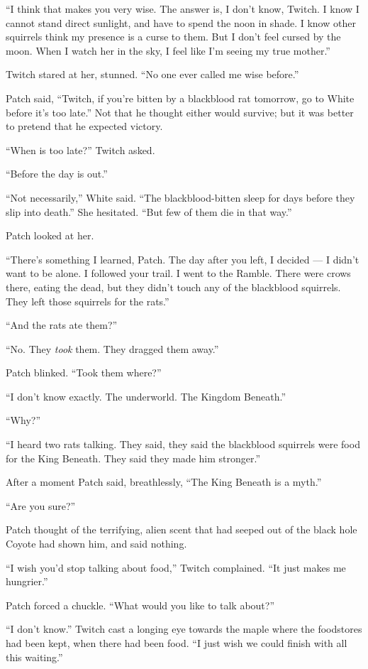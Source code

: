 \documentclass[ebook,oneside,openany,17pt]{memoir}
\begin{document}
“I think that makes you very wise. The answer is, I don’t know,
Twitch. I know I cannot stand direct sunlight, and have to spend the
noon in shade. I know other squirrels think my presence is a curse to
them. But I don’t feel cursed by the moon. When I watch her in the
sky, I feel like I’m seeing my true mother.”

Twitch stared at her, stunned. “No one ever called me wise before.”

Patch said, “Twitch, if you’re bitten by a blackblood rat tomorrow, go
to White before it’s too late.” Not that he thought either would
survive; but it was better to pretend that he expected victory.

“When is too late?” Twitch asked.

“Before the day is out.”

“Not necessarily,” White said. “The blackblood-bitten sleep for days
before they slip into death.” She hesitated. “But few of them die in
that way.”

Patch looked at her.

“There’s something I learned, Patch. The day after you left, I decided
— I didn’t want to be alone. I followed your trail. I went to the
Ramble. There were crows there, eating the dead, but they didn’t touch
any of the blackblood squirrels. They left those squirrels for the
rats.”

“And the rats ate them?”

“No. They \emph{took} them. They dragged them away.”

Patch blinked. “Took them where?”

“I don’t know exactly. The underworld. The Kingdom Beneath.”

“Why?”

“I heard two rats talking. They said, they said the blackblood
squirrels were food for the King Beneath. They said they made him
stronger.”

After a moment Patch said, breathlessly, “The King Beneath is a myth.”

“Are you sure?”

Patch thought of the terrifying, alien scent that had seeped out of
the black hole Coyote had shown him, and said nothing.

“I wish you’d stop talking about food,” Twitch complained. “It just
makes me hungrier.”

Patch forced a chuckle. “What would you like to talk about?”

“I don’t know.” Twitch cast a longing eye towards the maple where the
foodstores had been kept, when there had been food. “I just wish we
could finish with all this waiting.”
\end{document}

